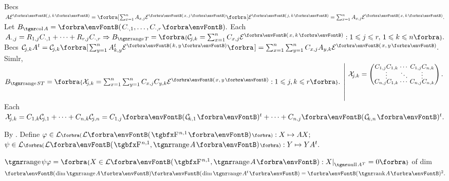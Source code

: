 Becs $A\mEnt{j,\,k}=\BigSbra{{\sum_{x=1}^nA_{x,j}\mEnt{x,\,j}}}\mEnt{j,\,k}=\sum_{x=1}^nA_{x,j}\mEnt{x,\,k}.$ \;Let $B_{\col A}=\Par{C_{\cdot,1},\dots,C_{\cdot,r}}.$\vspace{2pt}\parSol{}
Each $A_{\cdot,j}=R_{1,j}C_{\cdot,1}+\dots+R_{r,j}C_{\cdot,r}\Rightarrow B_{\range T}=\Bra{\mC_{\!j,k}=\sum_{x=1}^nC_{x,j}\mEnt{x,\,k}:1\leqslant j\leqslant r,\,1\leqslant k\leqslant n}.$\vspace{4pt}\parSol{}
Becs $\mC_{\!j,k}A^t=\mC_{\!j,k}\BigSbra{{\sum_{y=1}^nA^t_{k,y}\mEnt{k,\,y}}}=\sum_{x=1}^n\sum_{y=1}^nC_{x,j}A_{y,k}\mEnt{x,\,y}.$\vspace{-20pt}\parSol{}
Simlr, $B_{\range ST}=\Bra{\mX_{\!j,k}=\sum_{x=1}^n\sum_{y=1}^nC_{x,j}C_{y,k}\mEnt{x,\,y}:1\leqslant j,k\leqslant r}.\;\hMath{l}{\left|}{\right.}{\;\mX_{\!j,k}=\small\begin{pmatrix}C_{1,j}C_{1,k} &\hspace{-8pt} \cdots &\hspace{-8pt} C_{1,j}C_{n,k}\\[-4pt]
		\vdots &\hspace{-8pt} \ddots &\hspace{-8pt} \vdots\\[-4pt]
		C_{n,j}C_{1,k} &\hspace{-8pt} \cdots &\hspace{-8pt} C_{n,j}C_{n,k}\end{pmatrix}.\\[20pt]\,}$\vspace{-20pt}\parSol{}
Each $\mX_{\!j,k}=C_{1,k}\mC_{\!j,1}+\dots+C_{n,k}\mC_{\!j,n}=C_{1,j}\Par{\mC_{\!k,1}}{^t}+\dots+C_{n,j}\Par{\mC_{\!k,n}}{^t}.$\PfEnd\vspace{6pt}\par\quad
\Or By . Define $\varphi\in\Lm[\BigPar]{\Lm{\FbbP{n,1}}}:X\mapsto AX;$ \;$\psi\in\Lm[\BigPar]{\Lm{\FbbP{n,1},\range A}}:Y\mapsto YA^t.$\par\quad
$\range\psi\varphi=\Bra{X\in\Lm{\FbbP{n,1},\range A}:X\mmid_{\null A^T}=0}$ of dim $\Par{{\dim\range A}}\Par{{\dim\range A^t}}=\Par{\rank A}{^2}.$\PfEnd
\SepLine

